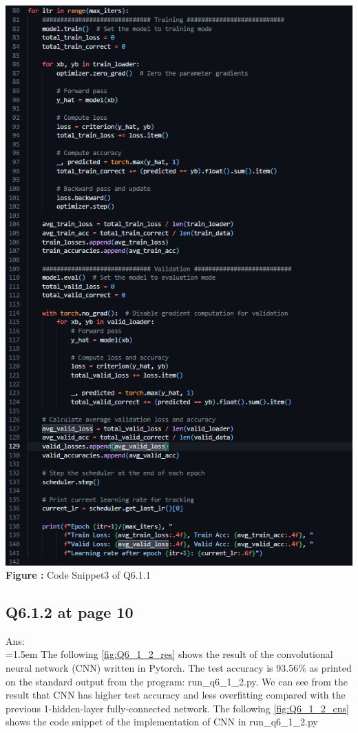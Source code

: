 \documentclass{article}
\begin{document}
\begin{minipage}{1\linewidth}
	\centering
	\hspace{0.12\linewidth} 
	\includegraphics[width=0.9\linewidth]{./Q6_1_cns3.png}  %
	\newline
	\textbf{Figure \thefigure:} Code Snippet3 of Q6.1.1 %
	\label{fig:Q61_cns3}  %
\end{minipage}

	\newpage	
	\subsection*{Q6.1.2 at page 10\texttt{}}
	Ans:\\
	\hangindent=1.5em \hspace{1.5em}The following \autoref{fig:Q6_1_2_res} shows the result of the convolutional neural network (CNN) written in Pytorch. The test accuracy is 93.56\% as printed on the standard output from the program: run\_q6\_1\_2.py. We can see from the result that CNN has higher test accuracy and less overfitting compared with the previous 1-hidden-layer fully-connected network. The following \autoref{fig:Q6_1_2_cns} shows the code snippet of the implementation of CNN in run\_q6\_1\_2.py 
	\newline
	
\end{document}
